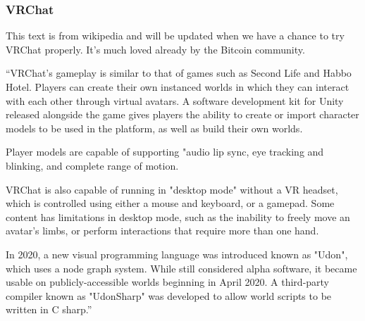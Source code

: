 \subsubsection{VRChat}
This text is from wikipedia and will be updated when we have a chance to try VRChat properly. It's much loved already by the Bitcoin community.\par
``VRChat's gameplay is similar to that of games such as Second Life and Habbo Hotel. Players can create their own instanced worlds in which they can interact with each other through virtual avatars. A software development kit for Unity released alongside the game gives players the ability to create or import character models to be used in the platform, as well as build their own worlds.\par
Player models are capable of supporting "audio lip sync, eye tracking and blinking, and complete range of motion.\par
VRChat is also capable of running in "desktop mode" without a VR headset, which is controlled using either a mouse and keyboard, or a gamepad. Some content has limitations in desktop mode, such as the inability to freely move an avatar's limbs, or perform interactions that require more than one hand.\par
In 2020, a new visual programming language was introduced known as "Udon", which uses a node graph system. While still considered alpha software, it became usable on publicly-accessible worlds beginning in April 2020. A third-party compiler known as "UdonSharp" was developed to allow world scripts to be written in C sharp.'' 
